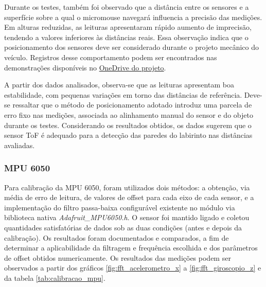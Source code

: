 Durante os testes, também foi observado que a distância entre os sensores e a superfície sobre a qual o micromouse navegará influencia a precisão das medições. Em alturas reduzidas, as leituras apresentaram rápido aumento de imprecisão, tendendo a valores inferiores às distâncias reais. Essa observação indica que o posicionamento dos sensores deve ser considerado durante o projeto mecânico do veículo. Registros desse comportamento podem ser encontrados nas demonstrações disponíveis no \href{https://unbbr-my.sharepoint.com/:v:/g/personal/231027079_aluno_unb_br/IQD2xGlDyRQrT7hCBopCS1RXAX4SP_C7y0wbpGJBctz3md8?nav=eyJyZWZlcnJhbEluZm8iOnsicmVmZXJyYWxBcHAiOiJPbmVEcml2ZUZvckJ1c2luZXNzIiwicmVmZXJyYWxBcHBQbGF0Zm9ybSI6IldlYiIsInJlZmVycmFsTW9kZSI6InZpZXciLCJyZWZlcnJhbFZpZXciOiJNeUZpbGVzTGlua0NvcHkifX0&e=rYLxsI}{OneDrive do projeto}. 

A partir dos dados analisados, observa-se que as leituras apresentam boa estabilidade, com pequenas variações em torno das distâncias de referência. Deve-se ressaltar que o método de posicionamento adotado introduz uma parcela de erro fixo nas medições, associada ao alinhamento manual do sensor e do objeto durante os testes. Considerando os resultados obtidos, os dados sugerem que o sensor ToF é adequado para a detecção das paredes do labirinto nas distâncias avaliadas. 

\subsubsection{MPU 6050}
Para calibração da MPU 6050, foram utilizados dois métodos: a obtenção, via média de erro de leitura, de valores de offset para cada eixo de cada sensor, e a implementação do filtro passa-baixa configurável existente no módulo via biblioteca nativa \emph{Adafruit\_MPU6050.h}. O sensor foi mantido ligado e coletou quantidades satisfatórias de dados sob as duas condições (antes e depois da calibração). Os resultados foram documentados e comparados, a fim de determinar a aplicabilidade da filtragem e frequência escolhida e dos parâmetros de offset obtidos numericamente. Os resultados das medições podem ser observados a partir dos gráficos \ref{fig:fft_acelerometro_x} a \ref{fig:fft_giroscopio_z} e da tabela \ref{tab:calibracao_mpu}.

